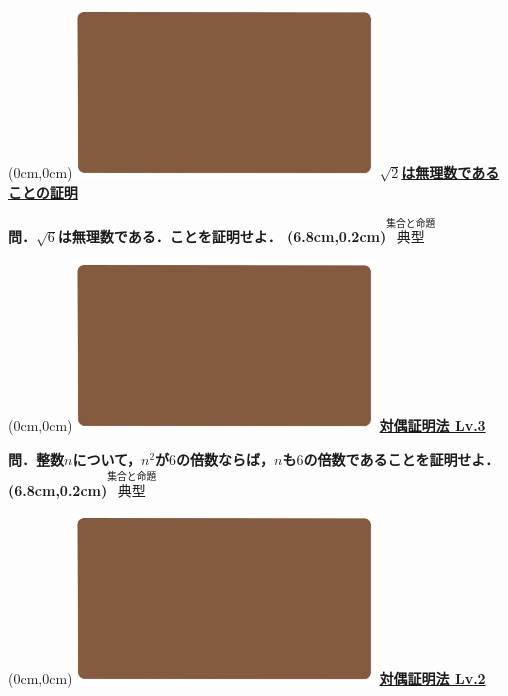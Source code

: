 \documentclass[10pt,
fleqn,
dvipdfmx,
uplatex
]{jsarticle}
\begin{document}
\at(0cm,0cm){\includegraphics[width=8cm,bb=0 0 1920 1080]{./youtube/thumbnails/templates/smart_background/集合と命題.jpeg}}
{\color{orange}\bf\boldmath\Large\underline{$\sqrt 2$は無理数であることの証明}}\vspace{0.3zw}

\huge 
\bf\boldmath 問．$\sqrt 6$は無理数である．ことを証明せよ．
\at(6.8cm,0.2cm){\small\color{bradorange}$\overset{\text{集合と命題}}{\text{典型}}$}


\newpage



\at(0cm,0cm){\includegraphics[width=8cm,bb=0 0 1920 1080]{./youtube/thumbnails/templates/smart_background/集合と命題.jpeg}}
{\color{orange}\bf\boldmath\LARGE\underline{対偶証明法 Lv.3 }}\vspace{0.3zw}

\LARGE 
\bf\boldmath 問．整数$n$について，$n^2$が$6$の倍数ならば，$n$も$6$の倍数であることを証明せよ．
\at(6.8cm,0.2cm){\small\color{bradorange}$\overset{\text{集合と命題}}{\text{典型}}$}


\newpage



\at(0cm,0cm){\includegraphics[width=8cm,bb=0 0 1920 1080]{./youtube/thumbnails/templates/smart_background/集合と命題.jpeg}}
{\color{orange}\bf\boldmath\LARGE\underline{対偶証明法 Lv.2 }}\vspace{0.3zw}
\end{document}
